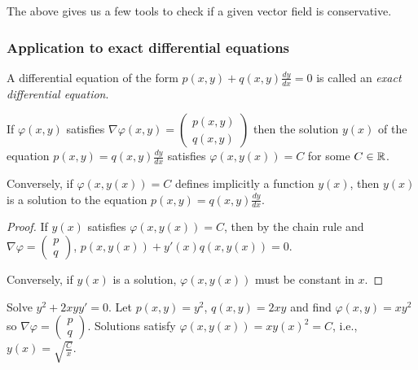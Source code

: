The above gives us a few tools to check if a given vector field is conservative.


\subsubsection*{Application to exact differential equations}

A  differential equation of the form \(p(x,y) + q(x,y) \frac{d y}{d x}=0\) is called an \emph{exact differential equation}.

\begin{theorem}%
    \label{thm:exact-diff-eq}
    If \(\varphi(x,y)\) satisfies
    \(\nabla \varphi(x,y) =   \left(\begin{smallmatrix}
            p(x,y) \\ q(x,y)
        \end{smallmatrix}\right)\)
    then the solution \(y(x)\) of the equation \(p(x,y) = q(x,y) \frac{d y}{d x}\) satisfies \(\varphi(x,y(x))=C\) for some \(C\in \mathbb{R}\).

    Conversely, if  \(\varphi(x,y(x))=C\)  defines implicitly a function \(y(x)\), then \(y(x)\) is a solution to the equation  \(p(x,y) = q(x,y) \frac{d y}{d x}\).
\end{theorem}

\begin{proof}
    If \(y(x)\) satisfies  \(\varphi(x,y(x))=C\), then by the chain rule and \(\nabla \varphi =   \left(\begin{smallmatrix}
        p \\ q
    \end{smallmatrix}\right)\), \(p(x,y(x)) + y'(x) q(x,y(x)) = 0\).

    Conversely, if \(y(x)\) is a solution, \(\varphi(x,y(x))\) must be constant in \(x\).
\end{proof}

\begin{example}
    Solve \(y^2 + 2xyy' = 0\).
    Let \(p(x,y) = y^2\), \(q(x,y) = 2xy\) and find \(\varphi(x,y) = xy^2\) so \(\nabla \varphi = \left(\begin{smallmatrix}
            p\\ q
        \end{smallmatrix}\right)\).
    Solutions satisfy \(\varphi(x,y(x))= x {y(x)}^2 =C\), i.e., \(y(x) = \sqrt{\frac{C}{x}}\).
\end{example}